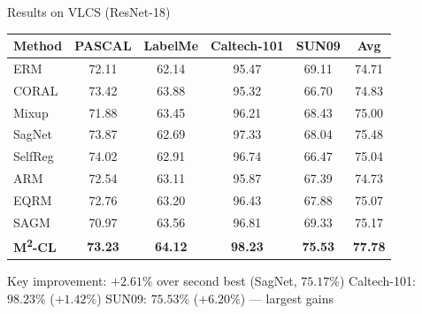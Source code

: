 \documentclass[aspectratio=169,10pt]{beamer}
\newcommand{\tablehl}{\rowcolor{LightBlue!60}}
\begin{document}
\begin{frame}{Results on VLCS (ResNet-18)}
  \centering
  \small
  \begin{tabular}{@{}lccccc@{}}
    \toprule
    \textbf{Method} & \textbf{PASCAL} & \textbf{LabelMe} & \textbf{Caltech-101} & \textbf{SUN09} & \textbf{Avg} \\
    \midrule
    ERM       & 72.11 & 62.14 & 95.47 & 69.11 & 74.71 \\
    CORAL     & 73.42 & 63.88 & 95.32 & 66.70 & 74.83 \\
    Mixup     & 71.88 & 63.45 & 96.21 & 68.43 & 75.00 \\
    SagNet    & 73.87 & 62.69 & 97.33 & 68.04 & 75.48 \\
    SelfReg   & 74.02 & 62.91 & 96.74 & 66.47 & 75.04 \\
    ARM       & 72.54 & 63.11 & 95.87 & 67.39 & 74.73 \\
    EQRM      & 72.76 & 63.20 & 96.43 & 67.88 & 75.07 \\
    SAGM      & 70.97 & 63.56 & 96.81 & 69.33 & 75.17 \\
    \midrule
    \tablehl
    \textbf{M\textsuperscript{2}-CL} & \textbf{73.23} & \textbf{64.12} & \textbf{98.23} & \textbf{75.53} & \textbf{77.78} \\
    \bottomrule
  \end{tabular}

  \vspace{0.4em}
  \begin{alertblock}{\small Key improvement: $+2.61\%$ over second best (SagNet, $75.17\%$)}
    \small Caltech-101: $98.23\%$ ($+1.42\%$) \quad SUN09: $75.53\%$ ($+6.20\%$) — largest gains
  \end{alertblock}
\end{frame}
\end{document}
